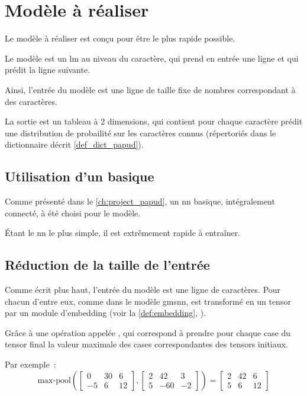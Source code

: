 \chapter{Modèle à réaliser}\label{ch:papud_model}
Le modèle à réaliser est conçu pour être le plus rapide possible.

Le modèle est un \gls{lm} au niveau du caractère, qui prend en entrée une ligne et qui prédit la ligne suivante.

Ainsi, l'entrée du modèle est une ligne de taille fixe de nombres correspondant à des caractères.

La sortie est un tableau à 2 dimensions, qui contient pour chaque caractère prédit une distribution de probailité sur les caractères connus (répertoriés dans le dictionnaire décrit \autoref{def_dict_papud}).

\section{Utilisation d'un  basique}
Comme présenté dans le \autoref{ch:project_papud}, un \gls{nn} basique, intégralement connecté, à été choisi pour le modèle.

Étant le \gls{nn} le plus simple, il est extrêmement rapide à entraîner.

\section{Réduction de la taille de l'entrée}
Comme écrit plus haut, l'entrée du modèle est une ligne de caractères.
Pour chacun d'entre eux, comme dans le modèle \gls{gmsnn}, est transformé en un \gls{tensor} par un module d'\gls{embedding} (voir la \autoref{def:embedding}, ).

Grâce à une opération appelée \og {} \fg{}, qui correspond à prendre pour chaque case du \gls{tensor} final la valeur maximale des cases correspondantes des \glspl{tensor} initiaux.

Par exemple~:
\[ \text{max-pool}\left(\left[\begin{array}{ccc}0&30&6\\-5&6&12\end{array}\right] , \left[ \begin{array}{ccc}2&42&3\\5&-60&-2\end{array}\right] \right) = \left[\begin{array}{ccc}2&42&6\\5&6&12\end{array}\right]  \]

